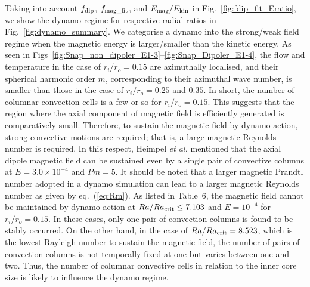 

Taking into account $f_{\rm dip}$, $f_{\rm mag\_fit}$, and $E_{\rm mag}/E_{\rm kin}$ in Fig.~\ref{fig:fdip_fit_Eratio}, we show the dynamo regime for respective radial ratios in Fig.~\ref{fig:dynamo_summary}.
We categorise a dynamo into the strong/weak field regime when the magnetic energy is larger/smaller than the kinetic energy.
As seen in Figs~\ref{fig:Snap_non_dipoler_E1-3}--\ref{fig:Snap_Dipoler_E1-4}, the flow and temperature in the case of $r_i / r_o = 0.15$ are azimuthally localised, and their spherical harmonic order $m$, corresponding to their azimuthal wave number, is smaller than those in the case of $r_i / r_o = 0.25$ and $0.35$.
In short, the number of columnar convection cells is a few or so for $r_i / r_o = 0.15$.
This suggests that the region where the axial component of magnetic field is efficiently generated is comparatively small.
Therefore, to sustain the magnetic field by dynamo action, strong convective motions are required; that is, a large magnetic Reynolds number is required.
In this respect, Heimpel {\it et al.}  mentioned that the axial dipole magnetic field can be sustained even by a single pair of convective columns at $E = 3.0 \times 10^{-4}$ and $Pm = 5$.
It should be noted that a larger magnetic Prandtl number adopted in a dynamo simulation can lead to a larger magnetic Reynolds number as given by eq.~(\ref{eq:Rm}).
As listed in Table~6, the magnetic field cannot be maintained by dynamo action at $Ra / Ra_{\rm crit} \le 7.103$ and $E = 10^{-4}$ for $r_i / r_o = 0.15$.
In these cases, only one pair of convection columns is found to be stably occurred.
On the other hand, in the case of $Ra / Ra_{\rm crit} = 8.523$, which is the lowest Rayleigh number to sustain the magnetic field, the number of pairs of convection columns is not temporally fixed at one but varies between one and two.
Thus, the number of columnar convective cells in relation to the inner core size is likely to influence the dynamo regime.

